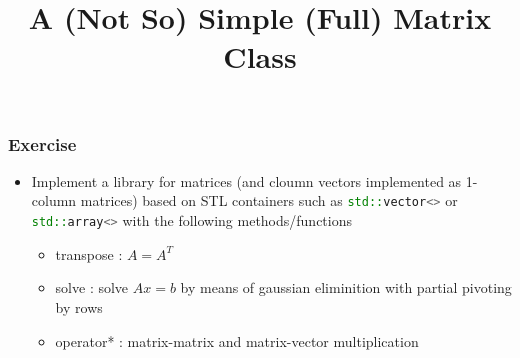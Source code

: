 \documentclass[smaller,a4paper,allowframebreaks]{beamer}
\begin{document}
\title{A (Not So) Simple (Full) Matrix Class}
\frame{\titlepage}

\begin{frame}
\frametitle{Exercise}

\begin{itemize}

  
\item Implement a
      library for matrices (and cloumn vectors 
      implemented as 1-column matrices) based on 
      STL containers such as \lstinline[language=C++]{std::vector<>}
      or \lstinline[language=C++]{std::array<>}
      with the following methods/functions
      \begin{itemize}
      \item transpose : $A = A^{T}$
      \item solve : solve $A x = b$ by means of gaussian eliminition with partial pivoting by rows
      \item operator* : matrix-matrix and matrix-vector multiplication
      \end{itemize}      
\end{itemize}
\end{frame}
\end{document}
